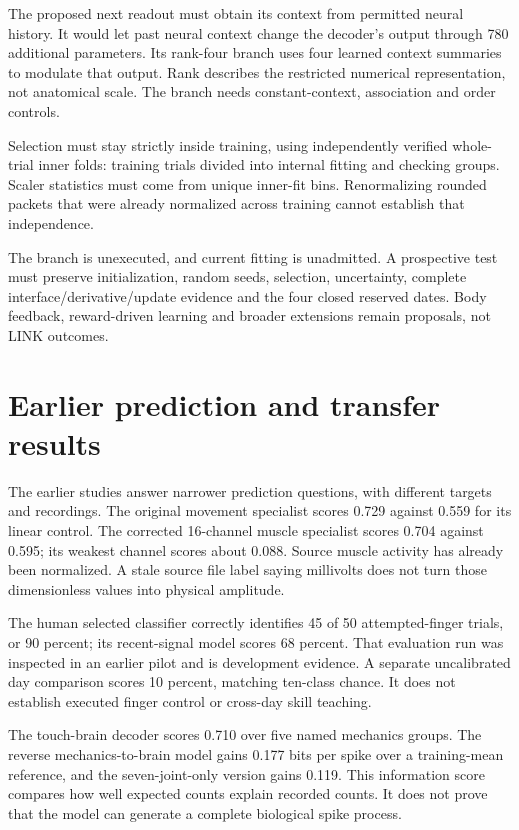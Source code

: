 The proposed next readout must obtain its context from permitted neural history. It would let past neural context change the decoder's output through 780 additional parameters. Its rank-four branch uses four learned context summaries to modulate that output. Rank describes the restricted numerical representation, not anatomical scale. The branch needs constant-context, association and order controls.

Selection must stay strictly inside training, using independently verified whole-trial inner folds: training trials divided into internal fitting and checking groups. Scaler statistics must come from unique inner-fit bins. Renormalizing rounded packets that were already normalized across training cannot establish that independence.

The branch is unexecuted, and current fitting is unadmitted. A prospective test must preserve initialization, random seeds, selection, uncertainty, complete interface/derivative/update evidence and the four closed reserved dates. Body feedback, reward-driven learning and broader extensions remain proposals, not LINK outcomes.


\section{Earlier prediction and transfer results}

The earlier studies answer narrower prediction questions, with different targets and recordings. The original movement specialist scores 0.729 against 0.559 for its linear
control. The corrected 16-channel muscle specialist scores 0.704 against
0.595; its weakest channel scores about 0.088. Source muscle activity has
already been normalized. A stale source file label saying millivolts does not
turn those dimensionless values into physical amplitude.

The human selected classifier correctly identifies 45 of 50 attempted-finger
trials, or 90 percent; its recent-signal model scores 68 percent. That evaluation
run was inspected in an earlier pilot and is development evidence. A separate
uncalibrated day comparison scores 10 percent, matching ten-class chance.
It does not establish executed finger control or cross-day skill teaching.

The touch-brain decoder scores 0.710 over five named mechanics groups. The
reverse mechanics-to-brain model gains 0.177 bits per spike over a training-mean
reference, and the seven-joint-only version gains 0.119. This information score
compares how well expected counts explain recorded counts. It does not prove
that the model can generate a complete biological spike process.

